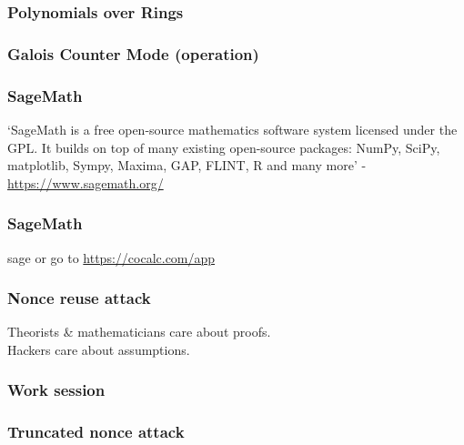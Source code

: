 \documentclass{beamer}
\begin{document}
\begin{frame}
\frametitle{Polynomials over Rings}
\end{frame}

\begin{frame}
\frametitle{Galois Counter Mode (operation)}
\end{frame}

\begin{frame}
\frametitle{SageMath}
`SageMath is a free open-source mathematics software system licensed under the GPL.
 It builds on top of many existing open-source packages:
 NumPy, SciPy, matplotlib, Sympy, Maxima, GAP, FLINT, R and many more'
 - \url{https://www.sagemath.org/}
\end{frame}

\begin{frame}
\frametitle{SageMath}
sage or go to \url{https://cocalc.com/app}
\end{frame}


\begin{frame}
\frametitle{Nonce reuse attack}
Theorists \& mathematicians care about proofs. \\
Hackers care about assumptions.
\end{frame}

\begin{frame}
\frametitle{Work session}
\end{frame}

\begin{frame}
\frametitle{Truncated nonce attack}
\end{frame}
\end{document}
